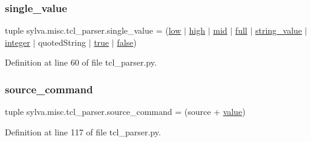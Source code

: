 \subsubsection{\texorpdfstring{single\+\_\+value}{single\_value}}
{\footnotesize\ttfamily tuple sylva.\+misc.\+tcl\+\_\+parser.\+single\+\_\+value = (\hyperlink{namespacesylva_1_1misc_1_1tcl__parser_a3e7d379d24d71398245bc0928adf3d96}{low} $\vert$ \hyperlink{namespacesylva_1_1misc_1_1tcl__parser_ae1450b8eb1791d39aebf72a6339c13ed}{high} $\vert$ \hyperlink{namespacesylva_1_1misc_1_1tcl__parser_afc97598c7f63cc5c0edee20b2c6e1841}{mid} $\vert$ \hyperlink{namespacesylva_1_1misc_1_1tcl__parser_acc30be6956c891e9bf8b6f3125e40e14}{full} $\vert$ \hyperlink{namespacesylva_1_1misc_1_1tcl__parser_a5f1213f66ee68863fc66dc54ceec2d1e}{string\+\_\+value} $\vert$ \hyperlink{namespacesylva_1_1misc_1_1tcl__parser_aaa6da6af48cbfc02e2f6edd078ea16ab}{integer} $\vert$ quoted\+String $\vert$ \hyperlink{namespacesylva_1_1misc_1_1tcl__parser_a69ee465af30df5bf43aeceff5d2575f5}{true} $\vert$ \hyperlink{namespacesylva_1_1misc_1_1tcl__parser_afd24314ff35451e53749e5b88bfded24}{false})}



Definition at line 60 of file tcl\+\_\+parser.\+py.

\mbox{\label{namespacesylva_1_1misc_1_1tcl__parser_ad3eb2c3b522821a7537d99228f52138f}} 
\subsubsection{\texorpdfstring{source\+\_\+command}{source\_command}}
{\footnotesize\ttfamily tuple sylva.\+misc.\+tcl\+\_\+parser.\+source\+\_\+command = (source + \hyperlink{namespacesylva_1_1misc_1_1tcl__parser_a83a1a4d978bc1a8a1bd92f71b754bad9}{value})}



Definition at line 117 of file tcl\+\_\+parser.\+py.

\mbox{\label{namespacesylva_1_1misc_1_1tcl__parser_a5f1213f66ee68863fc66dc54ceec2d1e}} 
